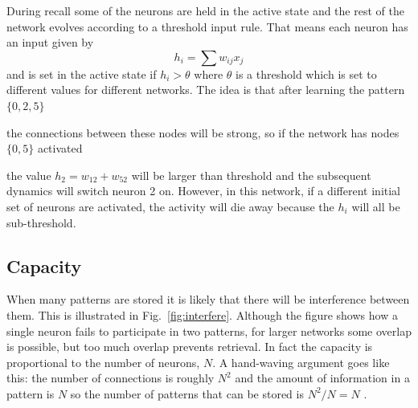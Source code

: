 \documentclass[11pt,a4paper]{scrartcl}
\begin{document}
During recall some of the neurons are held in the active state and the
rest of the network evolves according to a threshold input rule. That
means each neuron has an input given by
\begin{equation}
h_i=\sum{w_{ij}x_j}
\end{equation}
and is set in the active state if $h_i>\theta$ where $\theta$ is a
threshold which is set to different values for different networks. The idea is that after learning the pattern $\{0,2,5\}$ 
\begin{center}
\end{center}
the connections between these nodes will be strong, so if the network has nodes $\{0,5\}$ activated
\begin{center}
\end{center}
the value $h_{2}=w_{12}+w_{52}$ will be larger than threshold and the
subsequent dynamics will switch neuron 2 on. However, in this network,
if a different initial set of neurons are activated, the activity will
die away because the $h_i$ will all be sub-threshold.

\subsection*{Capacity}

When many patterns are stored it is likely that there will be
interference between them. This is illustrated in
Fig.~\ref{fig:interfere}. Although the figure shows how a single
neuron fails to participate in two patterns, for larger networks some
overlap is possible, but too much overlap prevents retrieval. In fact
the capacity is proportional to the number of neurons, $N$. A
hand-waving argument goes like this: the number of connections is
roughly $N^2$ and the amount of information in a pattern is $N$ so the
number of patterns that can be stored is $N^2/N=N$ \cite{Amit1992a}.
\end{document}
